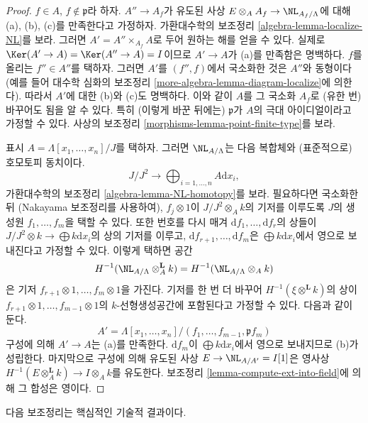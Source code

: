 \begin{proof}
$f \in A$, $f \not \in \mathfrak p$라 하자.
$A'' \to A_f$가 유도된 사상 $E \otimes_A A_f \to \NL_{A_f/\Lambda}$에 대해
(a), (b), (c)를 만족한다고 가정하자. 가환대수학의
보조정리 \ref{algebra-lemma-localize-NL}를 보라.
그러면 $A' = A'' \times_{A_f} A$로 두어 원하는 해를 얻을 수 있다.
실제로 $\Ker(A' \to A) = \Ker(A'' \to A) = I$이므로 $A' \to A$가 (a)를
만족함은 명백하다. $f$를 올리는 $f'' \in A''$를 택하자.
그러면 $A'$를 $(f'', f)$에서 국소화한 것은 $A''$와 동형이다
(예를 들어 대수학 심화의 보조정리
\ref{more-algebra-lemma-diagram-localize}에 의한다).
따라서 $A'$에 대한 (b)와 (c)도 명백하다.
이와 같이 $A$를 그 국소화 $A_f$로 (유한 번) 바꾸어도 됨을 알 수 있다.
특히 (이렇게 바꾼 뒤에는) $\mathfrak p$가 $A$의 극대 아이디얼이라고
가정할 수 있다. 사상의 보조정리 \ref{morphisms-lemma-point-finite-type}를 보라.

\medskip\noindent
표시 $A = \Lambda[x_1, \ldots, x_n]/J$를 택하자.
그러면 $\NL_{A/\Lambda}$는 다음 복합체와 (표준적으로) 호모토피 동치이다.
$$
J/J^2
\longrightarrow
\bigoplus\nolimits_{i = 1, \ldots, n} A\text{d}x_i,
$$
가환대수학의 보조정리 \ref{algebra-lemma-NL-homotopy}를 보라.
필요하다면 국소화한 뒤 (Nakayama 보조정리를 사용하여),
$f_j \otimes 1$이 $J/J^2 \otimes_A k$의 기저를 이루도록 $J$의 생성원
$f_1, \ldots, f_m$을 택할 수 있다.
또한 번호를 다시 매겨 $\text{d}f_1, \ldots, \text{d}f_r$의 상들이
$J/J^2 \otimes k \to \bigoplus k\text{d}x_i$의 상의 기저를 이루고,
$\text{d}f_{r + 1}, \ldots, \text{d}f_m$은 $\bigoplus k\text{d}x_i$에서
영으로 보내진다고 가정할 수 있다. 이렇게 택하면 공간
$$
H^{-1}(\NL_{A/\Lambda} \otimes^{\mathbf{L}}_A k) =
H^{-1}(\NL_{A/\Lambda} \otimes_A k)
$$
은 기저 $f_{r + 1} \otimes 1, \ldots, f_m \otimes 1$을 가진다.
기저를 한 번 더 바꾸어 $H^{-1}(\xi \otimes^{\mathbf{L}} k)$의 상이
$f_{r + 1} \otimes 1, \ldots, f_{m - 1} \otimes 1$의 $k$-선형생성공간에
포함된다고 가정할 수 있다. 다음과 같이 둔다.
$$
A' = \Lambda[x_1, \ldots, x_n]/(f_1, \ldots, f_{m - 1}, \mathfrak pf_m)
$$
구성에 의해 $A' \to A$는 (a)를 만족한다.
$\text{d}f_m$이 $\bigoplus k\text{d}x_i$에서 영으로 보내지므로 (b)가
성립한다. 마지막으로 구성에 의해 유도된 사상
$E \to \NL_{A/A'} = I[1]$은 영사상
$H^{-1}(E \otimes_A^\mathbf{L} k) \to I \otimes_A k$를 유도한다.
보조정리 \ref{lemma-compute-ext-into-field}에 의해 그 합성은 영이다.
\end{proof}

\noindent
다음 보조정리는 핵심적인 기술적 결과이다.

